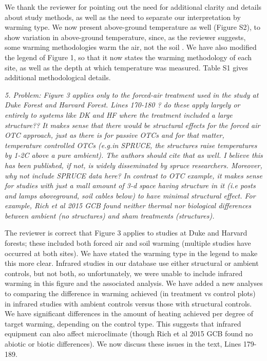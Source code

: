 \documentclass[11pt,a4paper]{letter}
\begin{document}
\par We thank the reviewer for pointing out the need for additional clarity and details about study methods, as well as the need to separate our interpretation by warming type. We now present above-ground temperature as well (Figure S2), to show variation in above-ground temperature, since, as the reviewer suggests, some warming methodologies warm the air, not the soil . We have also modified the legend of Figure 1, so that it now states the warming methodology of each site, as well as the depth at which temperature was measured. Table S1 gives additional methodological details.
\\

\par \emph{5. Problem: Figure 3 applies only to the forced-air treatment used in the study at Duke Forest and Harvard Forest. Lines 170-180 ? do these apply largely or entirely to systems like DK and HF where the treatment included a large structure?? It makes sense that there would be structural effects for the forced air OTC approach, just as there is for passive OTCs and for that matter, temperature controlled OTCs (e.g.in SPRUCE, the structures raise temperatures by 1-2C above a pure ambient). The authors should cite that as well. I believe this has been published, if not, is widely disseminated by spruce researchers. Moreover, why not include SPRUCE data here? In contrast to OTC example, it makes sense for studies with just a  mall amount of 3-d space having structure in it (i.e posts and lamps aboveground, soil cables below) to have minimal structural effect. For example, Rich et al 2015 GCB found neither thermal nor biological differences between ambient (no structures) and sham treatments (structures).}
\par The reviewer is correct that Figure 3 applies to studies at Duke and Harvard forests; these included both forced air and soil warming (multiple studies have occurred at both sites). We have stated the warming type in the legend to make this more clear. Infrared studies in our database use either structural or ambient controls, but not both, so unfortunately, we were unable to include infrared warming in this figure and the associated analysis. We have added a new analyses to comparing the difference in warming achieved (in treatment vs control plots) in infrared studies with ambient controls versus those with structural controls. We have significant differences in the amount of heating achieved per degree of target warming, depending on the control type. This suggests that infrared equipment can also affect microclimate (though  Rich et al 2015 GCB found no abiotic or biotic differences). We now discuss these issues in the text, Lines 179-189. 
\end{document}
